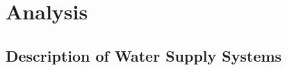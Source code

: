 
\part{Analysis}
\label{system_analysis}

\chapter{Description of Water Supply Systems}
\label{description_of_water_supply_systems}

 

























